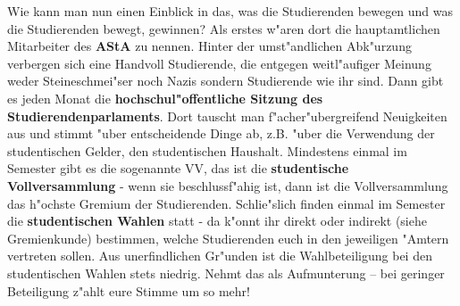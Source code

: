 Wie kann man nun einen Einblick in das, was die Studierenden bewegen und was 
die Studierenden bewegt, gewinnen? Als erstes w"aren dort die hauptamtlichen 
Mitarbeiter des \textbf{AStA} zu nennen. Hinter der umst"andlichen Abk"urzung 
verbergen sich eine Handvoll Studierende, die entgegen weitl"aufiger Meinung 
weder Steineschmei"ser noch Nazis sondern Studierende wie ihr sind. Dann gibt 
es jeden Monat die \textbf{hochschul"offentliche Sitzung des 
Studierendenparlaments}. Dort tauscht man f"acher"ubergreifend Neuigkeiten aus 
und stimmt "uber entscheidende Dinge ab, z.B. "uber die Verwendung der 
studentischen Gelder, den studentischen Haushalt. Mindestens einmal im Semester 
gibt es die sogenannte VV, das ist die \textbf{studentische Vollversammlung} - 
wenn sie beschlussf"ahig ist, dann ist die Vollversammlung das h"ochste Gremium 
der Studierenden.
Schlie"slich finden einmal im Semester die \textbf{studentischen Wahlen} statt 
- da k"onnt ihr direkt oder indirekt (siehe Gremienkunde) bestimmen, welche 
Studierenden euch in den jeweiligen "Amtern vertreten sollen. Aus 
unerfindlichen Gr"unden ist die Wahlbeteiligung bei den studentischen Wahlen 
stets niedrig. Nehmt das als Aufmunterung -- bei geringer Beteiligung z"ahlt 
eure Stimme um so mehr!
